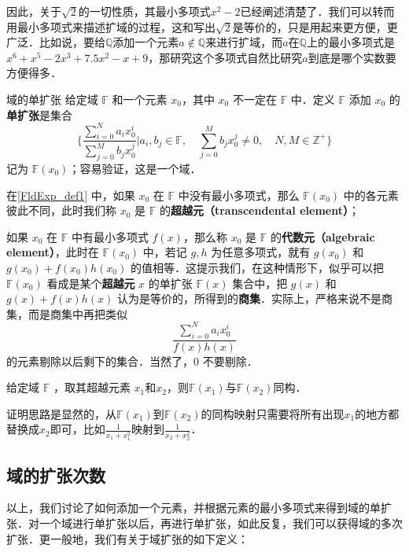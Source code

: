 因此，关于$\sqrt{2}$的一切性质，其最小多项式$x^2-2$已经阐述清楚了．我们可以转而用最小多项式来描述扩域的过程，这和写出$\sqrt{2}$是等价的，只是用起来更方便，更广泛．比如说，要给$\mathbb{Q}$添加一个元素$a\not\in \mathbb{Q}$来进行扩域，而$a$在$\mathbb{Q}$上的最小多项式是$x^6+x^5-2x^3+7.5x^2-x+9$，那研究这个多项式自然比研究$a$到底是哪个实数要方便得多．


\begin{definition}{域的单扩张}\label{FldExp_def1}
给定域 $\mathbb{F}$ 和一个元素 $x_0$，其中 $x_0$ 不一定在 $\mathbb{F}$ 中．定义 $\mathbb{F}$ 添加 $x_0$ 的\textbf{单扩张}是集合
\begin{equation}
\{\frac{\sum_{i=0}^N a_ix_0^i}{\sum_{j=0}^M b_jx_0^j}|a_i, b_j\in\mathbb{F},\quad\sum_{j=0}^M b_jx_0^j\not=0,\quad N, M\in\mathbb{Z}^+\}
\end{equation}
记为 $\mathbb{F}(x_0)$；容易验证，这是一个域．
\end{definition}

在\autoref{FldExp_def1} 中，如果 $x_0$ 在 $\mathbb{F}$ 中没有最小多项式，那么 $\mathbb{F}(x_0)$ 中的各元素彼此不同，此时我们称 $x_0$ 是 $\mathbb{F}$ 的\textbf{超越元（transcendental element）}； 

如果 $x_0$ 在 $\mathbb{F}$ 中有最小多项式 $f(x)$，那么称 $x_0$ 是 $\mathbb{F}$ 的\textbf{代数元（algebraic element）}，此时在 $\mathbb{F}(x_0)$ 中，若记 $g, h$ 为任意多项式，就有 $g(x_0)$ 和 $g(x_0)+f(x_0)h(x_0)$ 的值相等．这提示我们，在这种情形下，似乎可以把 $\mathbb{F}(x_0)$ 看成是某个\textbf{超越元} $x$ 的单扩张 $\mathbb{F}(x)$ 集合中，把 $g(x)$ 和 $g(x)+f(x)h(x)$ 认为是等价的，所得到的\textbf{商集}．实际上，严格来说不是商集，而是商集中再把类似$$\frac{\sum_{i=0}^N a_ix_0^i}{f(x)h(x)}$$的元素剔除以后剩下的集合．当然了，$0$ 不要剔除．

\begin{theorem}{}
给定域 $\mathbb{F}$ ，取其超越元素 $x_1$和$x_2$，则$\mathbb{F}(x_1)$与$\mathbb{F}(x_2)$同构．
\end{theorem}

证明思路是显然的，从$\mathbb{F}(x_1)$到$\mathbb{F}(x_2)$的同构映射只需要将所有出现$x_1$的地方都替换成$x_2$即可，比如$\frac{1}{x_1+x_1^2}$映射到$\frac{1}{x_2+x_2^2}$．



\subsection{域的扩张次数}

以上，我们讨论了如何添加一个元素，并根据元素的最小多项式来得到域的单扩张．对一个域进行单扩张以后，再进行单扩张，如此反复，我们可以获得域的多次扩张．更一般地，我们有关于域扩张的如下定义：

